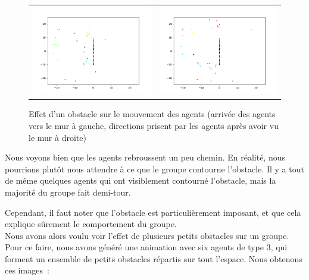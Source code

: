\documentclass[french, a4paper, 12pt, openany]{report}
\begin{document}
    
	\begin{figure}[!h]
		\centering
		\begin{tabular}{cc}
			\includegraphics[width=8cm]{images/image_19.png} & \includegraphics[width=8cm]{images/image_18.png} \\
		\end{tabular}
		\caption{Effet d'un obstacle sur le mouvement des agents (arrivée des agents vers le mur à gauche, directions prisent par les agents après avoir vu le mur à droite)}
		\label{obstacles}
	\end{figure}

	Nous voyons bien que les agents rebroussent un peu chemin. En réalité, nous pourrions plutôt nous attendre à ce que le groupe contourne l'obstacle. Il y a tout de même quelques agents qui ont visiblement contourné l'obstacle, mais la majorité du groupe fait demi-tour.
	
	Cependant, il faut noter que l'obstacle est particulièrement imposant, et que cela explique sûrement le comportement du groupe.\\
	
	Nous avons alors voulu voir l'effet de plusieurs petits obstacles sur un groupe. Pour ce faire, nous avons généré une animation avec six agents de type 3, qui forment un ensemble de petits obstacles répartis sur tout l'espace. Nous obtenons ces images~:
	
\end{document}
